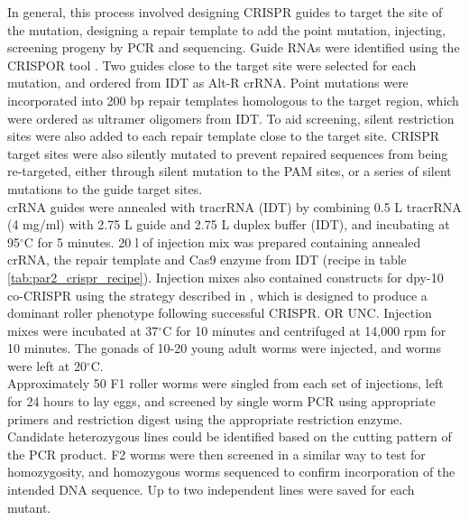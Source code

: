 \documentclass[12pt]{"report"}
\begin{document}
In general, this process involved designing CRISPR guides to target the site of the mutation, designing a repair template to add the point mutation, injecting, screening progeny by PCR and sequencing. Guide RNAs were identified using the CRISPOR tool \citep{Concordet2018}. Two guides close to the target site were selected for each mutation, and ordered from IDT as Alt-R crRNA. Point mutations were incorporated into 200 bp repair templates homologous to the target region, which were ordered as ultramer oligomers from IDT. To aid screening, silent restriction sites were also added to each repair template close to the target site. CRISPR target sites were also silently mutated to prevent repaired sequences from being re-targeted, either through silent mutation to the PAM sites, or a series of silent mutations to the guide target sites. \\

crRNA guides were annealed with tracrRNA (IDT) by combining 0.5 \textmu L tracrRNA (4 mg/ml) with 2.75 \textmu L guide and 2.75 \textmu L duplex buffer (IDT), and incubating at 95$^{\circ}$C for 5 minutes. 20 \textmu l of injection mix was prepared containing annealed crRNA, the repair template and Cas9 enzyme from IDT (recipe in table \ref{tab:par2_crispr_recipe}). Injection mixes also contained constructs for dpy-10 co-CRISPR using the strategy described in \textcite{Arribere2014}, which is designed to produce a dominant roller phenotype following successful CRISPR. OR UNC. Injection mixes were incubated at 37$^{\circ}$C for 10 minutes and centrifuged at 14,000 rpm for 10 minutes. The gonads of 10-20 young adult worms were injected, and worms were left at 20$^{\circ}$C.\\

Approximately 50 F1 roller worms were singled from each set of injections, left for 24 hours to lay eggs, and screened by single worm PCR using appropriate primers and restriction digest using the appropriate restriction enzyme. Candidate heterozygous lines could be identified based on the cutting pattern of the PCR product. F2 worms were then screened in a similar way to test for homozygosity, and homozygous worms sequenced to confirm incorporation of the intended DNA sequence. Up to two independent lines were saved for each mutant.\\
\end{document}
